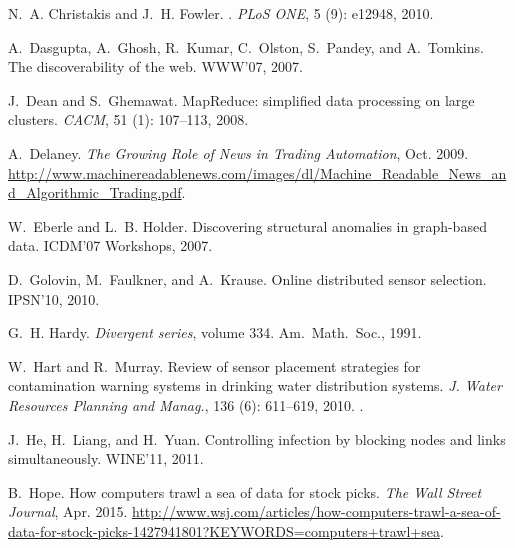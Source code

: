 \begin{thebibliography}{41}
N.~A. Christakis and J.~H. Fowler.
.
\newblock \emph{PLoS ONE}, 5 (9): e12948, 2010.

A.~Dasgupta, A.~Ghosh, R.~Kumar, C.~Olston, S.~Pandey, and A.~Tomkins.
\newblock The discoverability of the web.
\newblock WWW'07, 2007.

J.~Dean and S.~Ghemawat.
\newblock MapReduce: simplified data processing on large clusters.
\newblock \emph{CACM}, 51 (1): 107--113,
  2008.

A.~Delaney.
\newblock \emph{The Growing Role of News in Trading Automation}, Oct. 2009.
\newblock
  \url{http://www.machinereadablenews.com/images/dl/Machine_Readable_News_and_Algorithmic_Trading.pdf}.

W.~Eberle and L.~B. Holder.
\newblock Discovering structural anomalies in graph-based data.
\newblock ICDM'07 Workshops, 2007.

D.~Golovin, M.~Faulkner, and A.~Krause.
\newblock Online distributed sensor selection.
\newblock IPSN'10, 2010.

G.~H. Hardy.
\newblock \emph{Divergent series}, volume 334.
\newblock Am.~Math.~Soc., 1991.

W.~Hart and R.~Murray.
\newblock Review of sensor placement strategies for contamination warning
  systems in drinking water distribution systems.
\newblock \emph{J. Water Resources Planning and Manag.},
  136 (6): 611--619, 2010.
\newblock {}.

J.~He, H.~Liang, and H.~Yuan.
\newblock Controlling infection by blocking nodes and links simultaneously.
\newblock WINE'11, 2011.

B.~Hope.
\newblock How computers trawl a sea of data for stock picks.
\newblock \emph{The Wall Street Journal}, Apr. 2015.
\newblock
  \url{http://www.wsj.com/articles/how-computers-trawl-a-sea-of-data-for-stock-picks-1427941801?KEYWORDS=computers+trawl+sea}.


\end{thebibliography}
